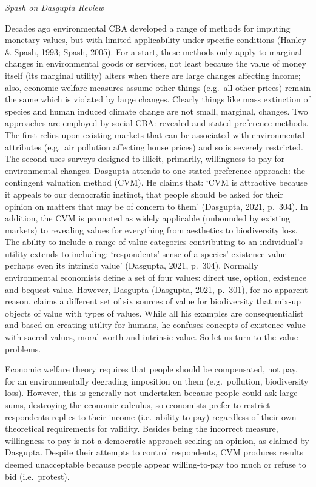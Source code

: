 \documentclass[
]{book}
\begin{document}
\emph{Spash on Dasgupta Review}

Decades ago environmental CBA developed a range of methods for imputing monetary values, but
with limited applicability under specific conditions (Hanley \& Spash, 1993; Spash, 2005). For a
start, these methods only apply to marginal changes in environmental goods or services, not
least because the value of money itself (its marginal utility) alters when there are large changes
affecting income; also, economic welfare measures assume other things (e.g.~all other prices) remain
the same which is violated by large changes. Clearly things like mass extinction of species and
human induced climate change are not small, marginal, changes.
Two approaches are employed by social CBA: revealed and stated preference methods. The first relies
upon existing markets that can be associated with environmental attributes (e.g.~air pollution affecting
house prices) and so is severely restricted. The second uses surveys designed to illicit, primarily,
willingness-to-pay for environmental changes. Dasgupta attends to one stated preference approach: the
contingent valuation method (CVM). He claims that: `CVM is attractive because it appeals to our
democratic instinct, that people should be asked for their opinion on matters that may be of concern
to them' (Dasgupta, 2021, p.~304). In addition, the CVM is promoted as widely applicable (unbounded
by existing markets) to revealing values for everything from aesthetics to biodiversity loss. The ability to
include a range of value categories contributing to an individual's utility extends to including:
`respondents' sense of a species' existence value---perhaps even its intrinsic value' (Dasgupta, 2021, p.~304).
Normally environmental economists define a set of four values: direct use, option, existence and bequest
value. However, Dasgupta (Dasgupta, 2021, p.~301), for no apparent reason, claims a different set of
six sources of value for biodiversity that mix-up objects of value with types of values. While all his
examples are consequentialist and based on creating utility for humans, he confuses concepts of
existence value with sacred values, moral worth and intrinsic value. So let us turn to the value problems.

Economic welfare theory requires that people should be
compensated, not pay, for an environmentally degrading imposition on them (e.g.~pollution,
biodiversity loss). However, this is generally not undertaken because people could ask large sums,
destroying the economic calculus, so economists prefer to restrict respondents replies to their
income (i.e.~ability to pay) regardless of their own theoretical requirements for validity.
Besides being the incorrect measure, willingness-to-pay is not a democratic approach
seeking an opinion, as claimed by Dasgupta.
Despite their attempts to control respondents, CVM produces results
deemed unacceptable because people appear willing-to-pay too much or refuse to bid (i.e.~protest).
\end{document}
